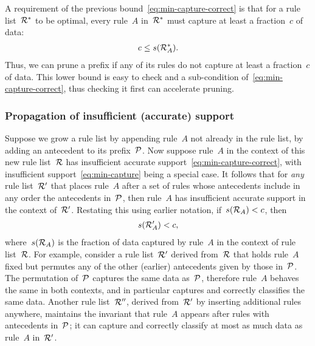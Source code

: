 A requirement of the previous bound~\eqref{eq:min-capture-correct}
is that for a rule list~${\mathcal R}^*$ to be optimal, every rule~$A$ in~${\mathcal R}^*$ must
capture at least a fraction~$c$ of data:
\begin{align}
c \le s(\RL_A^*).
\label{eq:min-capture}
\end{align}
Thus, we can prune a prefix if any of its rules do not capture at least
a fraction~$c$ of data.
%
This lower bound is easy to check and a sub-condition of~\eqref{eq:min-capture-correct},
thus checking it first can accelerate pruning.

\subsubsection{Propagation of insufficient (accurate) support}

Suppose we grow a rule list by appending rule~$A$ not already in the rule list,
\ie by adding an antecedent to its prefix~${\mathcal P}$.
%
Now suppose rule~$A$ in the context of this new rule list~${\mathcal R}$ has
insufficient accurate support~\eqref{eq:min-capture-correct},
with insufficient support~\eqref{eq:min-capture} being a special case.
%
It follows that for \emph{any} rule list~${\mathcal R}'$ that places rule~$A$ after
a set of rules whose antecedents include in any order the antecedents in~${\mathcal P}$,
then rule~$A$ has insufficient accurate support in the context of~${\mathcal R}'$.
%
Restating this using earlier notation, if~${s({\mathcal R}_A) < c}$, then
\begin{align}
s(\RL'_A) < c,
\end{align}
where~$s({\mathcal R}_A)$ is the fraction of data captured by rule~$A$ in the context of rule list~${\mathcal R}$.
%
For example, consider a rule list~${\mathcal R}'$ derived from~${\mathcal R}$ that holds rule~$A$ fixed
but permutes any of the other (earlier) antecedents given by those in~${\mathcal P}$.
%
The permutation of~${\mathcal P}$ captures the same data as~${\mathcal P}$,
therefore rule~$A$ behaves the same in both contexts,
and in particular captures and correctly classifies the same data.
%
Another rule list~${\mathcal R}''$, derived from~${\mathcal R}'$ by inserting additional rules anywhere,
maintains the invariant that rule~$A$ appears after rules with antecedents in~${\mathcal P}$;
it can capture and correctly classify at most as much data as rule~$A$ in~${\mathcal R}'$.
%

